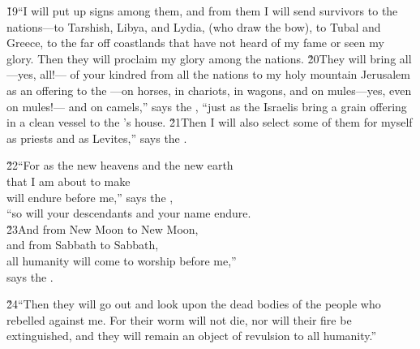 \v{19}``I will put up signs among them, and from them I will send survivors to the nations---to Tarshish, Libya, and Lydia, (who draw the bow), to Tubal and Greece, to the far off coastlands that have not heard of my fame or seen my glory. Then they will proclaim my glory among the nations. \v{20}They will bring all---yes, all!--- of your kindred from all the nations to my holy mountain Jerusalem as an offering to the ---on horses, in chariots, in wagons, and on mules---yes, even on mules!--- and on camels,'' says the , ``just as the Israelis bring a grain offering in a clean vessel to the 's house. \v{21}Then I will also select some of them for myself as priests and as Levites,'' says the .

\begin{poetry}
\poeml \v{22}``For as the new heavens and the new earth \\
\poemll    that I am about to make \\
\poeml will endure before me,'' says the , \\
\poemll    ``so will your descendants and your name endure. \\
\poeml \v{23}And from New Moon to New Moon, \\
\poemll    and from Sabbath to Sabbath, \\
\poeml all humanity will come to worship before me,'' \\
\poemll    says the .
\end{poetry}

\v{24}``Then they will go out and look upon the dead bodies of the people who rebelled against me. For their worm will not die, nor will their fire be extinguished, and they will remain an object of revulsion to all humanity.''
